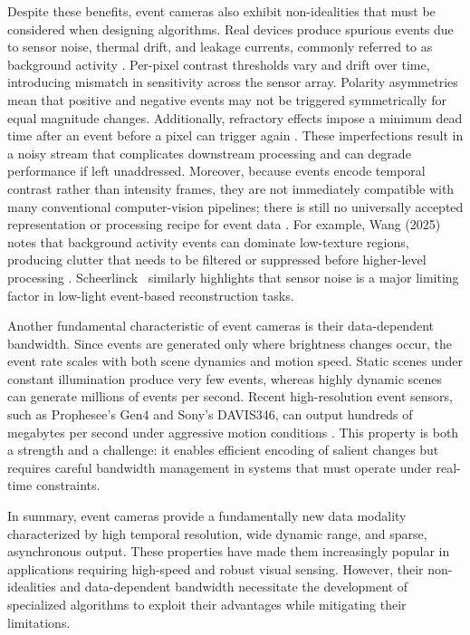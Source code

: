 Despite these benefits, event cameras also exhibit non-idealities that must be considered when designing algorithms. Real devices produce spurious events due to sensor noise, thermal drift, and leakage currents, commonly referred to as background activity \cite{Gallego2020Survey}. Per-pixel contrast thresholds vary and drift over time, introducing mismatch in sensitivity across the sensor array. Polarity asymmetries mean that positive and negative events may not be triggered symmetrically for equal magnitude changes. Additionally, refractory effects impose a minimum dead time after an event before a pixel can trigger again \cite{Delbruck2020}. These imperfections result in a noisy stream that complicates downstream processing and can degrade performance if left unaddressed. Moreover, because events encode temporal contrast rather than intensity frames, they are not immediately compatible with many conventional computer-vision pipelines; there is still no universally accepted representation or processing recipe for event data \cite{Gallego2020Survey}. For example, Wang (2025) notes that background activity events can dominate low-texture regions, producing clutter that needs to be filtered or suppressed before higher-level processing \cite{Wang2025Thesis}. Scheerlinck~\cite{Scheerlinck2021Thesis} similarly highlights that sensor noise is a major limiting factor in low-light event-based reconstruction tasks.

Another fundamental characteristic of event cameras is their data-dependent bandwidth. Since events are generated only where brightness changes occur, the event rate scales with both scene dynamics and motion speed. Static scenes under constant illumination produce very few events, whereas highly dynamic scenes can generate millions of events per second. Recent high-resolution event sensors, such as Prophesee’s Gen4 and Sony’s DAVIS346, can output hundreds of megabytes per second under aggressive motion conditions \cite{Finateu2020ISSCC}. This property is both a strength and a challenge: it enables efficient encoding of salient changes but requires careful bandwidth management in systems that must operate under real-time constraints.

In summary, event cameras provide a fundamentally new data modality characterized by high temporal resolution, wide dynamic range, and sparse, asynchronous output. These properties have made them increasingly popular in applications requiring high-speed and robust visual sensing. However, their non-idealities and data-dependent bandwidth necessitate the development of specialized algorithms to exploit their advantages while mitigating their limitations.


